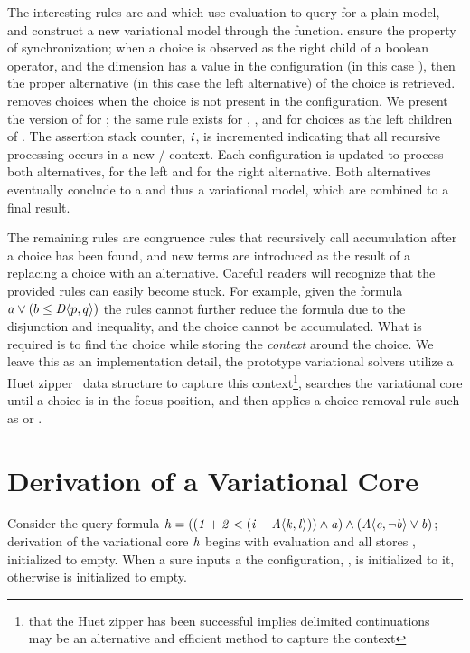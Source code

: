 The interesting rules are  and  which use evaluation to
query for a plain model, and construct a new variational model through the
 function.  ensure the property of
synchronization; when a choice is observed as the right child of a boolean
operator, and the dimension has a value in the configuration (in this case
\true{}), then the proper alternative (in this case the left alternative) of the
choice is retrieved.  removes choices when the choice is not
present in the configuration. We present the version of  for
\inequalities{}; the same rule exists for \boolFuncs{}, \integerFuncs{}, and for
choices as the left children of \inequalities{}. The assertion stack counter,
$\mathit{i}$, is incremented indicating that all recursive processing occurs in a
new / context. Each configuration is updated to process
both alternatives, \true{} for the left and \false{} for the right alternative.
Both alternatives eventually conclude to a \unit{} and thus a variational model,
which are combined to a final result.

The remaining rules are congruence rules that recursively call accumulation
after a choice has been found, and new terms are introduced as the result of a
replacing a choice with an alternative. Careful readers will recognize that the
provided rules can easily become stuck. For example, given the formula $a \vee{}
(b \leq{} \chc[D]{p,q})$ the rules cannot further reduce the formula due to the
disjunction and inequality, and the choice cannot be accumulated. What is
required is to find the choice while storing the \emph{context} around the
choice. We leave this as an implementation detail, the prototype variational
solvers utilize a Huet zipper~\cite{huet_1997} data structure to capture this
context\footnote{that the Huet zipper has been successful implies delimited
  continuations~ may be an alternative and efficient method to
  capture the context}, searches the variational core until a choice is in the
focus position, and then applies a choice removal rule such as
 or .

\section{Derivation of a Variational Core}
Consider the query formula $\kf{h = ((1 + 2 < (i - \chc[A]{k,l})) \wedge a)
  \wedge (\chc[A]{c,\neg b} \vee b)}$; derivation of the variational core
$\mathit{h}$ begins with evaluation and all stores \aStore{}, \eStore{} initialized
to empty. When a sure inputs a \vc{} the configuration, \configuration{}, is
initialized to it, otherwise \configuration{} is initialized to empty.

